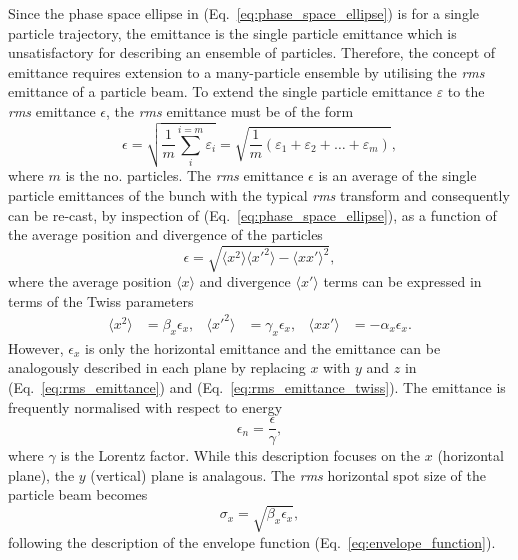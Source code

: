 \documentclass[../main.tex]{subfiles}
\begin{document}
Since the phase space ellipse in (Eq.~\ref{eq:phase_space_ellipse}) is for a single particle trajectory, the emittance is the single particle emittance which is unsatisfactory for describing an ensemble of particles. Therefore, the concept of emittance requires extension to a many-particle ensemble by utilising the \textit{rms} emittance of a particle beam. To extend the single particle emittance $\varepsilon$ to the \textit{rms} emittance $\epsilon$, the \textit{rms} emittance must be of the form
\begin{equation}
\epsilon = \sqrt{\frac{1}{m}\sum_{i}^{i=m}\varepsilon_{i}} = \sqrt{\frac{1}{m}\left(\varepsilon_{1}+\varepsilon_{2}+\ldots+\varepsilon_{m}\right)},
\label{eq:rms_emittance_transform}    
\end{equation}
where $m$ is the no. particles. The \textit{rms} emittance $\epsilon$ is an average of the single particle emittances of the bunch with the typical \textit{rms} transform and consequently can be re-cast, by inspection of (Eq.~\ref{eq:phase_space_ellipse}), as a function of the average position and divergence of the particles
\begin{equation}
\epsilon = \sqrt{\langle x^{2}\rangle\langle x'^{2}\rangle-\langle xx'\rangle^{2}},
\label{eq:rms_emittance}    
\end{equation}
where the average position $\langle x\rangle$ and divergence $\langle x'\rangle$ terms can be expressed in terms of the Twiss parameters
\begin{align}
\langle x^{2}\rangle &= \beta_{x}\epsilon_{x}, &
\langle x'^{2}\rangle &= \gamma_{x}\epsilon_{x}, &
\langle xx'\rangle &= -\alpha_{x}\epsilon_{x}.
\label{eq:rms_emittance_twiss}    
\end{align}
However, $\epsilon_{x}$ is only the horizontal emittance and the emittance can be analogously described in each plane by replacing $x$ with $y$ and $z$ in (Eq.~\ref{eq:rms_emittance}) and (Eq.~\ref{eq:rms_emittance_twiss}). The emittance is frequently normalised with respect to energy \begin{equation}
\epsilon_{n} = \frac{\epsilon}{\gamma},    
\label{eq:normalised_emittance}
\end{equation}
where $\gamma$ is the Lorentz factor. While this description focuses on the $x$ (horizontal plane), the $y$ (vertical) plane is analagous. The \textit{rms} horizontal spot size of the particle beam becomes
\begin{equation}
\sigma_{x} = \sqrt{\beta_{x}\epsilon_{x}},
\label{eq:spot_size_particle}    
\end{equation}
following the description of the envelope function (Eq.~\ref{eq:envelope_function}).
\end{document}

